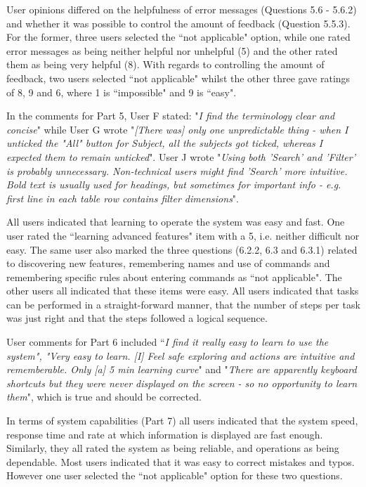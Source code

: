 User opinions differed on the helpfulness of error messages (Questions 5.6 - 5.6.2) and whether it was possible to control the amount of feedback (Question 5.5.3). For the former, three users selected the ``not applicable" option, while one rated error messages as being neither helpful nor unhelpful (5) and the other rated them as being very helpful (8). With regards to controlling the amount of feedback, two users selected ``not applicable" whilst the other three gave ratings of 8, 9 and 6, where 1 is ``impossible" and 9 is ``easy".	

In the comments for Part 5, User F stated: "\textit{I find the terminology clear and concise}" while User G wrote "\textit{[There was] only one unpredictable thing - when I unticked the "All" button for Subject, all the subjects got ticked, whereas I expected them to remain unticked}". User J wrote "\textit{Using both 'Search' and 'Filter' is probably unnecessary. Non-technical users might find 'Search' more intuitive. Bold text is usually used for headings, but sometimes for important info - e.g. first line in each table row contains filter dimensions}".

All users indicated that learning to operate the system was easy and fast. One user rated the ``learning advanced features" item with a 5, i.e. neither difficult nor easy. The same user also marked the three questions (6.2.2, 6.3 and 6.3.1) related to discovering new features, remembering names and use of commands and remembering specific rules about entering commands as ``not applicable". The other users all indicated that these items were easy. All users indicated that tasks can be performed in a straight-forward manner, that the number of  steps per task was just right and that the steps followed a logical sequence. 

User comments for Part 6 included ``\textit{I find it really easy to learn to use the system", "Very easy to learn. [I] Feel safe exploring and actions are intuitive and rememberable. Only [a] 5 min learning curve}" and "\textit{There are apparently keyboard shortcuts but they were never displayed on the screen - so no opportunity to learn them}", which is true and should be corrected.

In terms of system capabilities (Part 7) all users indicated that the system speed, response time and rate at which information is displayed are fast enough. Similarly, they all rated the system as being reliable, and operations as being dependable. Most users indicated that it was easy to correct mistakes and typos.  However one user selected the ``not applicable" option for these two questions. 

